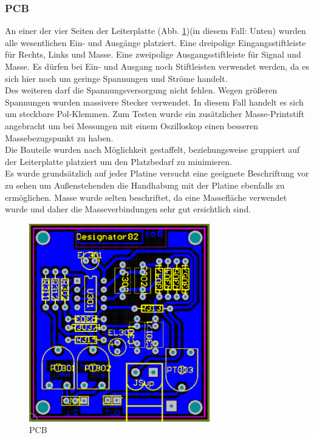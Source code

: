 \subsubsection{PCB}\label{subsec:5.5.3}
An einer der vier Seiten der Leiterplatte (Abb. \ref{fig:5.5.3.1})(in diesem Fall: Unten) wurden alle wesentlichen Ein- und Ausgänge platziert.
Eine dreipolige Eingangsstiftleiste für Rechts, Links und Masse.
Eine zweipolige Ausgangsstiftleiste für Signal und Masse.
Es dürfen bei Ein- und Ausgang noch Stiftleisten verwendet werden, da es sich hier noch um geringe Spannungen und Ströme handelt.\\
Des weiteren darf die Spannungsversorgung nicht fehlen.
Wegen größeren Spannungen wurden massivere Stecker verwendet.
In diesem Fall handelt es sich um steckbare Pol-Klemmen.
Zum Testen wurde ein zusätzlicher Masse-Printstift angebracht um bei Messungen mit einem Oszilloskop einen besseren Massebezugspunkt zu haben.\\
Die Bauteile wurden nach Möglichkeit gestaffelt, beziehungsweise gruppiert auf der Leiterplatte platziert um den Platzbedarf zu minimieren.\\
Es wurde grundsätzlich auf jeder Platine versucht eine geeignete Beschriftung vor zu sehen um Außenstehenden die Handhabung mit der Platine ebenfalls zu ermöglichen. Masse wurde selten beschriftet, da eine Massefläche verwendet wurde und daher die Masseverbindungen sehr gut ersichtlich sind.
\begin{figure} [H]
	\centering
	\includegraphics[width=0.7\textwidth]{img/Print3/3mTTWeicheruAddierer-PCB.PNG}
	\caption{PCB}
	\label {fig:5.5.3.1}
\end{figure}














